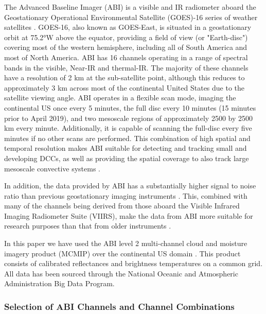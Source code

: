 \documentclass[amt, manuscript]{copernicus}
\begin{document}
The Advanced Baseline Imager (ABI) is a visible and IR radiometer aboard the Geostationary Operational Environmental Satellite (GOES)-16 series of weather satellites \citep{schmit_closer_2016}.
GOES-16, also known as GOES-East, is situated in a geostationary orbit at 75.2°W above the equator, providing a field of view (or "Earth-disc") covering most of the western hemisphere, including all of South America and most of North America.
ABI has 16 channels operating in a range of spectral bands in the visible, Near-IR and thermal-IR.
The majority of these channels have a resolution of 2 \unit{km} at the sub-satellite point, although this reduces to approximately 3 \unit{km} across most of the continental United States due to the satellite viewing angle.
ABI operates in a flexible scan mode, imaging the continental US once every 5 minutes, the full disc every 10 minutes (15 minutes prior to April 2019), and two mesoscale regions of approximately 2500 by 2500 \unit{km} every minute.
Additionally, it is capable of scanning the full-disc every five minutes if no other scans are performed.
This combination of high spatial and temporal resolution makes ABI suitable for detecting and tracking small and developing DCCs, as well as providing the spatial coverage to also track large mesoscale convective systems \citep{heikenfeld_tobac_2019}.

In addition, the data provided by ABI has a substantially higher signal to noise ratio than previous geostationary imaging instruments \citep{iacovazzi_goes-16_2020}.
This, combined with many of the channels being derived from those aboard the Visible Infrared Imaging Radiometer Suite (VIIRS), make the data from ABI more suitable for research purposes than that from older instruments \citep{heidinger_chapter_2020}.

In this paper we have used the ABI level 2 multi-channel cloud and moisture imagery product (MCMIP) over the continental US domain \citep{schmit_chapter_2020}.
This product consists of calibrated reflectances and brightness temperatures on a common grid.
All data has been sourced through the National Oceanic and Atmospheric Administration Big Data Program.

\subsubsection{Selection of ABI Channels and Channel Combinations}
\end{document}

